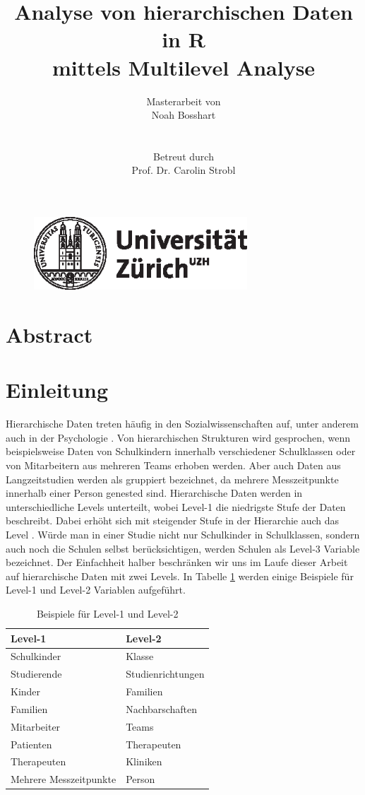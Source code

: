 \documentclass[12pt]{article}\usepackage[]{graphicx}\usepackage[]{color}
\title{Analyse von hierarchischen Daten in R \\ mittels Multilevel Analyse}
\author{Masterarbeit von \\ Noah Bosshart \\ \\ \\ Betreut durch \\ Prof. Dr. Carolin Strobl}
\begin{document}
\begin{figure}[t]
  \centering
  \includegraphics[width = 8cm]{uzh_logo}
\end{figure}

\maketitle

\newpage
\tableofcontents

\newpage
\section{Abstract}

\newpage

\section{Einleitung}
Hierarchische Daten treten häufig in den Sozialwissenschaften auf, unter anderem auch in der Psychologie \citep{SnijdersTomA.B2012Ma:a}. Von hierarchischen Strukturen wird gesprochen, wenn beispielsweise Daten von Schulkindern innerhalb verschiedener Schulklassen oder von Mitarbeitern aus mehreren Teams erhoben werden. Aber auch Daten aus Langzeitstudien werden als gruppiert bezeichnet, da mehrere Messzeitpunkte innerhalb einer Person genested sind. Hierarchische Daten werden in unterschiedliche Levels unterteilt, wobei Level-1 die niedrigste Stufe der Daten beschreibt. Dabei erhöht sich mit steigender Stufe in der Hierarchie auch das Level \citep{SnijdersTomA.B2012Ma:a}. Würde man in einer Studie nicht nur Schulkinder in Schulklassen, sondern auch noch die Schulen selbst berücksichtigen, werden Schulen als Level-3 Variable bezeichnet. Der Einfachheit halber beschränken wir uns im Laufe dieser Arbeit auf hierarchische Daten mit zwei Levels. In Tabelle \ref{tab:beispiele_levels} werden einige Beispiele für Level-1 und Level-2 Variablen aufgeführt. 

\begin{table}[h!]
\centering
\begin{tabular}{ll}
\hline
Level-1 				& Level-2 	\\
\hline	
Schulkinder 			& Klasse 	\\
Studierende 			& Studienrichtungen \\
Kinder 					& Familien 	\\
Familien 				& Nachbarschaften \\
Mitarbeiter 			& Teams \\
Patienten 				& Therapeuten \\
Therapeuten 			& Kliniken \\
Mehrere Messzeitpunkte 	& Person \\
\hline
\end{tabular}
\caption{Beispiele für Level-1 und Level-2}
\label{tab:beispiele_levels}
\end{table}
\end{document}
